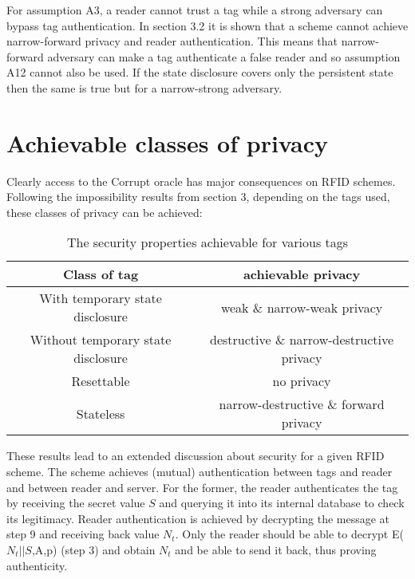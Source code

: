     For assumption A3, a reader cannot trust a tag while a strong adversary can bypass tag authentication. In section 3.2 it is shown 
    that a scheme cannot
    achieve narrow-forward privacy and reader authentication. This means that narrow-forward adversary can make a tag authenticate
    a false reader and so assumption A12 cannot also be used. If the state disclosure covers only the persistent state then the same is
    true but for a narrow-strong adversary.

\section{Achievable classes of privacy}

    Clearly access to the Corrupt oracle has major consequences on RFID schemes. Following the impossibility results from section 3, 
    depending on the tags used, these classes of privacy can be achieved:

    \begin{table}[H]
    \centering
    \caption{The security properties achievable for various tags}
    \begin{tabular}{| c | c |}
        \hline
        Class of tag & achievable privacy \\
        \hline
        With temporary state disclosure & weak \& narrow-weak privacy\\
        Without temporary state disclosure & destructive \& narrow-destructive privacy\\
        Resettable & no privacy \\
        Stateless & narrow-destructive \& forward privacy \\
        \hline
    \end{tabular}
    \end{table}

    These results lead to an extended discussion about security for a given RFID scheme. The \cite{BOM} scheme achieves (mutual)
    authentication between tags and reader and between reader and server. For the former, the reader authenticates the tag by
    receiving the secret value $S$ and querying it into its internal database to check its legitimacy. Reader authentication is
    achieved by decrypting the message at step 9 and receiving back value $N_t$. Only the reader should be able to decrypt 
    E($N_t||S$,A,p) (step 3) and obtain $N_t$ and be able to send it back, thus proving authenticity.
    
